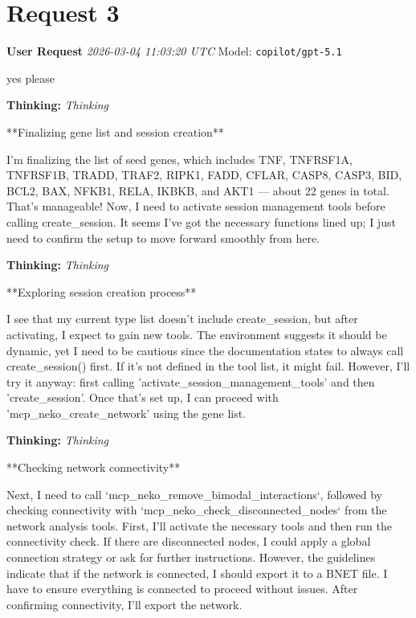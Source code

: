 \documentclass[11pt,a4paper]{article}
\begin{document}
\section{Request 3}
\begin{userbox}
\textbf{User Request}
\quad \textit{2026-03-04 11:03:20 UTC}
\quad Model: \texttt{copilot/gpt-5.1}

yes please

\end{userbox}
\begin{thinkbox}
\textbf{Thinking:} \textit{Thinking}

**Finalizing gene list and session creation**

I'm finalizing the list of seed genes, which includes TNF, TNFRSF1A, TNFRSF1B, TRADD, TRAF2, RIPK1, FADD, CFLAR, CASP8, CASP3, BID, BCL2, BAX, NFKB1, RELA, IKBKB, and AKT1 — about 22 genes in total. That's manageable! Now, I need to activate session management tools before calling create\_session. It seems I've got the necessary functions lined up; I just need to confirm the setup to move forward smoothly from here.

\end{thinkbox}
\begin{thinkbox}
\textbf{Thinking:} \textit{Thinking}

**Exploring session creation process**

I see that my current type list doesn't include create\_session, but after activating, I expect to gain new tools. The environment suggests it should be dynamic, yet I need to be cautious since the documentation states to always call create\_session() first. If it’s not defined in the tool list, it might fail. However, I’ll try it anyway: first calling 'activate\_session\_management\_tools' and then 'create\_session'. Once that's set up, I can proceed with 'mcp\_neko\_create\_network' using the gene list.

\end{thinkbox}
\begin{thinkbox}
\textbf{Thinking:} \textit{Thinking}

**Checking network connectivity**

Next, I need to call `mcp\_neko\_remove\_bimodal\_interactions`, followed by checking connectivity with `mcp\_neko\_check\_disconnected\_nodes` from the network analysis tools. First, I’ll activate the necessary tools and then run the connectivity check. If there are disconnected nodes, I could apply a global connection strategy or ask for further instructions. However, the guidelines indicate that if the network is connected, I should export it to a BNET file. I have to ensure everything is connected to proceed without issues. After confirming connectivity, I’ll export the network.

\end{thinkbox}
\end{document}
